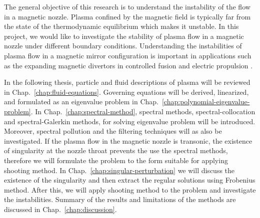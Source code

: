 The general objective of this research is to understand the instability of the flow in a magnetic nozzle. Plasma confined by the magnetic field is typically far from the state of the thermodynamic equilibrium which makes it unstable. In this project, we would like to investigate the stability of plasma flow in a magnetic nozzle under different boundary conditions. Understanding the instabilities of plasma flow in a magnetic mirror configuration is important in applications such as the expanding magnetic divertors in controlled fusion and electric propulsion \cite{ryutov_divertor_2016,kaganovich_2020_physics}.

In the following thesis, particle and fluid descriptions of plasma will be reviewed in Chap.~\ref{chap:fluid-equations}. Governing equations will be derived, linearized, and formulated as an eigenvalue problem in Chap.~\ref{chap:polynomial-eigenvalue-problem}. In Chap.~\ref{chap:spectral-method}, spectral methods, spectral-collocation and spectral-Galerkin methods, for solving eigenvalue problem will be introduced.  Moreover, spectral pollution and the filtering techniques will as also be investigated. If the plasma flow in the magnetic nozzle is transonic, the existence of singularity at the nozzle throat prevents the use the spectral methods, therefore we will formulate the problem to the form suitable for applying shooting method. In Chap.~\ref{chap:singular-perturbation} we will discuss the existence of the singularity and then extract the regular solutions using Frobenius method. After this, we will apply shooting method to the problem and investigate the instabilities. Summary of the results and limitations of the methods are discussed in Chap.~\ref{chap:discussion}.

